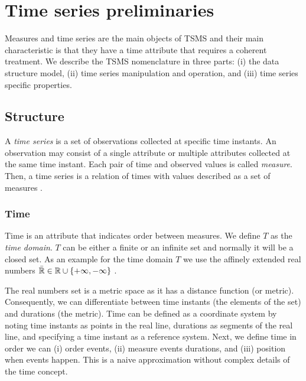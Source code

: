 

\section{Time series preliminaries}
\label{sec:model:preliminaries}



Measures and time series are the main objects of TSMS and their main
characteristic is that they have a time attribute that requires a
coherent treatment. We describe the TSMS nomenclature in three parts:
(i) the data structure model, (ii) time series manipulation and
operation, and (iii) time series specific properties.



\subsection{Structure}


A \emph{time series} is a set of observations collected at specific
time instants. An observation may consist of a single attribute or
multiple attributes collected at the same time instant.  Each pair of
time and observed values is called \emph{measure}. Then, a time series
is a relation of times with values described as a set of measures .





\subsubsection{Time}

Time is an attribute that indicates order between measures. We define
$T$ as the \emph{time domain}. $T$ can be either a finite or an infinite set
and normally it will be a closed set. As an example for the time
domain $T$ we use the affinely extended real numbers $\bar{\mathbb{R}} \in \mathbb{R} \cup
\{+\infty,-\infty\}$ \cite{cantrell:extendedreal}.

The real numbers set is a metric space as it has a distance function
(or metric). Consequently, we can differentiate between time instants
(the elements of the set) and durations (the metric). Time can be
defined as a coordinate system
\cite{iep:time-supplement,kopetz11:realtime} by noting time instants
as points in the real line, durations as segments of the real line,
and specifying a time instant as a reference system. Next, we define
time in order we can (i) order events, (ii) measure events durations,
and (iii) position when events happen. This is a naive approximation
without complex details of the time concept.

